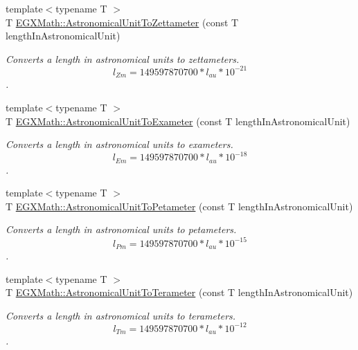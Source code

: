 \begin{DoxyCompactItemize}
{\footnotesize template$<$typename T $>$ }\\T \mbox{\hyperlink{group___e_g_x_math-_conversions-_length_conversions-_astronomical-_astronomical_unit-_s_i_ga7fcac45015ba20b9dd52b328ddb29ed9}{E\+G\+X\+Math\+::\+Astronomical\+Unit\+To\+Zettameter}} (const T length\+In\+Astronomical\+Unit)
\begin{DoxyCompactList}\small\item\em Converts a length in astronomical units to zettameters. \[ l_{Zm}=149597870700 * l_{au} * 10^{-21} \]. \end{DoxyCompactList}\item 
{\footnotesize template$<$typename T $>$ }\\T \mbox{\hyperlink{group___e_g_x_math-_conversions-_length_conversions-_astronomical-_astronomical_unit-_s_i_ga393f3407128b5b84500a5c16796ebed4}{E\+G\+X\+Math\+::\+Astronomical\+Unit\+To\+Exameter}} (const T length\+In\+Astronomical\+Unit)
\begin{DoxyCompactList}\small\item\em Converts a length in astronomical units to exameters. \[ l_{Em}=149597870700 * l_{au} * 10^{-18} \]. \end{DoxyCompactList}\item 
{\footnotesize template$<$typename T $>$ }\\T \mbox{\hyperlink{group___e_g_x_math-_conversions-_length_conversions-_astronomical-_astronomical_unit-_s_i_gad8745fa5ccc5e8170717b4fd70c66623}{E\+G\+X\+Math\+::\+Astronomical\+Unit\+To\+Petameter}} (const T length\+In\+Astronomical\+Unit)
\begin{DoxyCompactList}\small\item\em Converts a length in astronomical units to petameters. \[ l_{Pm}=149597870700 * l_{au} * 10^{-15} \]. \end{DoxyCompactList}\item 
{\footnotesize template$<$typename T $>$ }\\T \mbox{\hyperlink{group___e_g_x_math-_conversions-_length_conversions-_astronomical-_astronomical_unit-_s_i_gac398353ade6e245157c1aa623792f1e3}{E\+G\+X\+Math\+::\+Astronomical\+Unit\+To\+Terameter}} (const T length\+In\+Astronomical\+Unit)
\begin{DoxyCompactList}\small\item\em Converts a length in astronomical units to terameters. \[ l_{Tm}=149597870700 * l_{au} * 10^{-12} \]. \end{DoxyCompactList}\item 

\end{DoxyCompactItemize}
